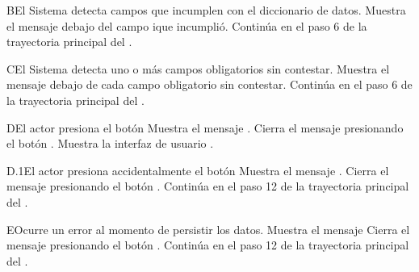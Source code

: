 \begin{UCtrayectoriaA}{B}{El Sistema detecta campos que incumplen con el diccionario de datos.}
    \UCpaso Muestra el mensaje  debajo del campo ique incumplió.
    \UCpaso Continúa en el paso 6 de la trayectoria principal del .
\end{UCtrayectoriaA}
\begin{UCtrayectoriaA}{C}{El Sistema detecta uno o más campos obligatorios sin contestar.}
    \UCpaso Muestra el mensaje   debajo de cada campo obligatorio sin contestar.
    \UCpaso Continúa en el paso 6 de la trayectoria principal del .
\end{UCtrayectoriaA}
\begin{UCtrayectoriaA}{D}{El actor presiona el botón }
    \UCpaso Muestra el mensaje .
    \UCpaso[\UCactor] Cierra el mensaje presionando el botón .
    \UCpaso Muestra la interfaz de usuario .
\end{UCtrayectoriaA}
\begin{UCtrayectoriaA}{D.1}{El actor presiona accidentalmente el botón }
    \UCpaso Muestra el mensaje .
    \UCpaso[\UCactor] Cierra el mensaje presionando el botón .
    \UCpaso Continúa en el paso 12 de la trayectoria principal del .
\end{UCtrayectoriaA}
\begin{UCtrayectoriaA}{E}{Ocurre un error al momento de persistir los datos.}
    \UCpaso Muestra el mensaje 
    \UCpaso[\UCactor] Cierra el mensaje presionando el botón .
    \UCpaso Continúa en el paso 12 de la trayectoria principal del .
\end{UCtrayectoriaA}
